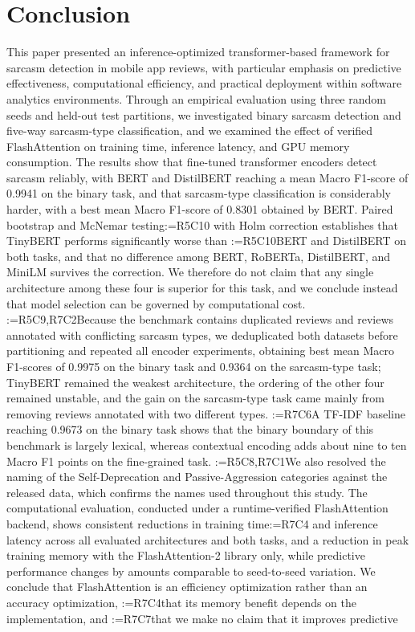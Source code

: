 \documentclass[a4paper,fleqn]{cas-sc}
\makeatletter
\newif\iftracked
\newcommand{\rv@setcolour}[1]{%
  \IfStrEq{#1}{R7C7}{\color{rvEdit}}{%
    \IfSubStr{#1}{R5}{\IfSubStr{#1}{R7}{\color{rvBoth}}{\color{rvFive}}}{\color{rvSeven}}}}
\newcommand{\rv@tag}[1]{\textsuperscript{\sffamily\bfseries\scriptsize[\StrSubstitute{#1}{,}{, }]}\,}
\newcommand{\rv@recordone}[1]{%
  \edef\rv@i{#1}%
  \ifcsdef{rv@n@\rv@i}{}{\csgdef{rv@n@\rv@i}{0}}%
  \csxdef{rv@n@\rv@i}{\the\numexpr\csuse{rv@n@\rv@i}+1\relax}%
  \begingroup\edef\@currentlabel{\rv@i}\label{rv:\rv@i:\csuse{rv@n@\rv@i}}\endgroup}
\newcommand{\rv@record}[1]{\@for\rv@id:=#1\do{\expandafter\rv@recordone\expandafter{\rv@id}}}
\DeclareRobustCommand{\rc}[2]{\rv@record{#1}\iftracked{\rv@setcolour{#1}\rv@tag{#1}#2}\else#2\fi}
\DeclareRobustCommand{\rcrep}[3]{\rv@record{#1}\iftracked{\rv@setcolour{#1}\rv@tag{#1}\rv@strike{#2} #3}\else#3\fi}
\DeclareRobustCommand{\rce}[1]{\rv@record{R7C7}\iftracked{\color{rvEdit}#1}\else#1\fi}
\makeatother
\begin{document}
\section{Conclusion}
\label{sec:conclusion}
This paper presented an inference-optimized transformer-based framework for sarcasm detection in mobile app reviews, with particular emphasis on predictive effectiveness, computational efficiency, and practical deployment within software analytics environments. Through an empirical evaluation using three random seeds and held-out test partitions, we investigated binary sarcasm detection and five-way sarcasm-type classification, and we examined the effect of verified FlashAttention on training time, inference latency, and GPU memory consumption. The results show that fine-tuned transformer encoders detect sarcasm reliably, with BERT and DistilBERT reaching a mean Macro F1-score of 0.9941 on the binary task, and that sarcasm-type classification is considerably harder, with a best mean Macro F1-score of 0.8301 obtained by BERT. Paired bootstrap and McNemar testing\rc{R5C10}{ with Holm correction} establishes that TinyBERT performs significantly worse than \rcrep{R5C10}{the other four architectures on both tasks, and that the differences among BERT, RoBERTa, DistilBERT, and MiniLM are not reliably distinguishable across seeds}{BERT and DistilBERT on both tasks, and that no difference among BERT, RoBERTa, DistilBERT, and MiniLM survives the correction}. We therefore do not claim that any single architecture among these four is superior for this task, and we conclude instead that model selection can be governed by computational cost. \rc{R5C9,R7C2}{Because the benchmark contains duplicated reviews and reviews annotated with conflicting sarcasm types, we deduplicated both datasets before partitioning and repeated all encoder experiments, obtaining best mean Macro F1-scores of 0.9975 on the binary task and 0.9364 on the sarcasm-type task; TinyBERT remained the weakest architecture, the ordering of the other four remained unstable, and the gain on the sarcasm-type task came mainly from removing reviews annotated with two different types.} \rc{R7C6}{A TF-IDF baseline reaching 0.9673 on the binary task shows that the binary boundary of this benchmark is largely lexical, whereas contextual encoding adds about nine to ten Macro F1 points on the fine-grained task.} \rc{R5C8,R7C1}{We also resolved the naming of the Self-Deprecation and Passive-Aggression categories against the released data, which confirms the names used throughout this study.} The computational evaluation, conducted under a runtime-verified FlashAttention backend, shows consistent reductions in training time\rcrep{R7C4}{, inference latency, and peak GPU memory across all evaluated architectures and both tasks}{ and inference latency across all evaluated architectures and both tasks, and a reduction in peak training memory with the FlashAttention-2 library only}, while predictive performance changes by amounts comparable to seed-to-seed variation. We conclude that FlashAttention is an efficiency optimization rather than an accuracy optimization, \rc{R7C4}{that its memory benefit depends on the implementation, }and \rce{that} we make no claim that it improves predictive 
\end{document}
